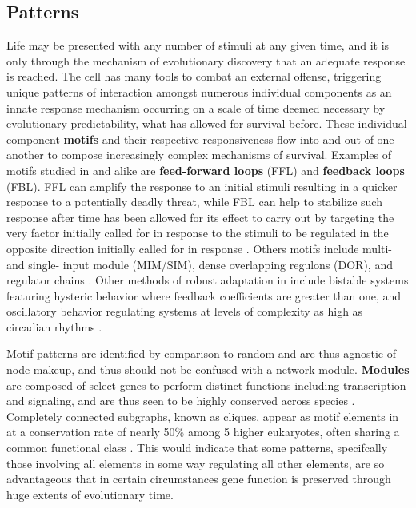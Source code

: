 \subsection{Patterns}
\label{sec:pat}
Life may be presented with any number of stimuli at any given time, and it is only through the mechanism of evolutionary discovery that an adequate response is reached. The cell has many tools to combat an external offense, triggering unique patterns of interaction amongst numerous individual components as an innate response mechanism occurring on a scale of time deemed necessary by evolutionary predictability, \ie what has allowed for survival before. These individual component \textbf{motifs} and their respective responsiveness flow into and out of one another to compose increasingly complex mechanisms of survival. Examples of motifs studied in \coli  and \yeast alike are \textbf{feed-forward loops} (FFL) and \textbf{feedback loops} (FBL).  FFL can amplify the response to an initial stimuli resulting in a quicker response to a potentially deadly threat, while FBL can help to stabilize such response after time has been allowed for its effect to carry out by targeting the very factor initially called for in response to the stimuli to be regulated in the opposite direction initially called for in response \citep{milo2002network} \citep{mangan2003structure}. Others motifs include multi- and single- input module (MIM/SIM), dense overlapping regulons (DOR), and regulator chains \citep{kalir2005coherent} \citep{lee2002transcriptional}. Other methods of robust adaptation in  \coli include bistable systems featuring hysteric behavior where feedback coefficients are greater than one, and oscillatory behavior regulating systems at levels of complexity as high as circadian rhythms \citep{szallasi2006system}.

Motif patterns are identified by comparison to random and are thus agnostic of node makeup, and thus should not be confused with a network module. \textbf{Modules} are composed of select genes \eg to perform distinct functions including transcription and signaling, and are thus seen to be highly conserved across species \citep{alon2007network}. Completely connected subgraphs, known as cliques, appear as motif elements in \yeast at a conservation rate of nearly 50\% among 5 higher eukaryotes, often sharing a common functional class \citep{wuchty2003evolutionary}. This would indicate that some patterns, specifcally those involving all elements in some way regulating all other elements, are so advantageous that in certain circumstances gene function is preserved through huge extents of evolutionary time.

